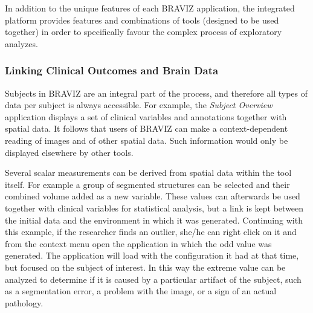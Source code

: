 \documentclass{frontiersHLTH}
\begin{document}
In addition to the unique features of each BRAVIZ application, the integrated platform provides features and combinations of tools (designed to be used together) in order to specifically favour the complex process of exploratory analyzes.


\subsubsection{Linking Clinical Outcomes and Brain Data}

Subjects in BRAVIZ are an integral part of the process, and therefore all types of data per  subject is always accessible. For example, the \emph{Subject Overview} application displays a set of clinical variables and annotations together with spatial data. It follows that users of BRAVIZ can make a context-dependent reading of images and of other spatial data. Such information would only be displayed elsewhere by other tools.


Several scalar measurements can be derived from spatial data within the tool itself. For example a group of segmented structures can be selected and their combined volume added as a new variable. These values can afterwards be used together with clinical variables for statistical analysis, but a link is kept between the initial data and the environment in which it was generated. Continuing with this example, if the researcher finds an outlier, she/he can right click on it and from the context menu open the application in which the odd value was generated. The application will load with the configuration it had at that time, but focused on the subject of interest. In this way the extreme value can be analyzed to determine if it is caused by a particular artifact of the subject, such as a segmentation error, a problem with the image, or a sign of an actual pathology.

\end{document}
